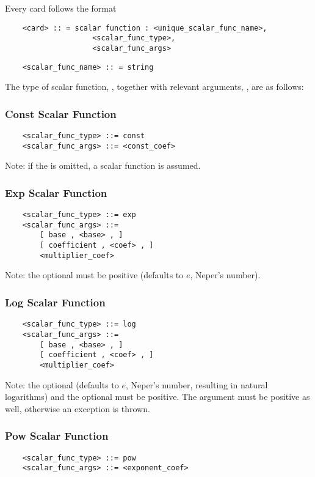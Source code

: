 \noindent
Every  card follows the format
\begin{verbatim}
    <card> :: = scalar function : <unique_scalar_func_name>, 
                    <scalar_func_type>,
                    <scalar_func_args>
\end{verbatim}
\begin{verbatim}
    <scalar_func_name> :: = string 
\end{verbatim}

\noindent
The type of scalar function,
, together 
with relevant arguments, ,
are as follows:
\subsubsection{Const Scalar Function}
\begin{verbatim}
    <scalar_func_type> ::= const
    <scalar_func_args> ::= <const_coef>
\end{verbatim}
Note: if the  is omitted,
a  scalar function is assumed.

\subsubsection{Exp Scalar Function}
\begin{verbatim}
    <scalar_func_type> ::= exp
    <scalar_func_args> ::=
        [ base , <base> , ]
        [ coefficient , <coef> , ]
        <multiplier_coef>
\end{verbatim}
Note: the optional  must be positive (defaults to $e$, Neper's number).

\subsubsection{Log Scalar Function}
\begin{verbatim}
    <scalar_func_type> ::= log
    <scalar_func_args> ::=
        [ base , <base> , ]
        [ coefficient , <coef> , ]
        <multiplier_coef>
\end{verbatim}
Note: the optional  (defaults to $e$, Neper's number,
resulting in natural logarithms)
and the optional 
must be positive.
The argument must be positive as well, otherwise an exception is thrown.

\subsubsection{Pow Scalar Function}
\begin{verbatim}
    <scalar_func_type> ::= pow
    <scalar_func_args> ::= <exponent_coef>
\end{verbatim}

